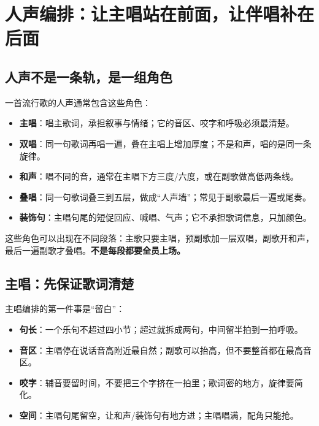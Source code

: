 \chapter{人声编排：让主唱站在前面，让伴唱补在后面}
\label{ch:vocals}


\section{人声不是一条轨，是一组角色}
\label{sec:vocal-roles}

一首流行歌的人声通常包含这些角色：

\begin{itemize}
\item \textbf{主唱}：唱主歌词，承担叙事与情绪；它的音区、咬字和呼吸必须最清楚。
\item \textbf{双唱}：同一句歌词再唱一遍，叠在主唱上增加厚度；不是和声，唱的是同一条旋律。
\item \textbf{和声}：唱不同的音，通常在主唱下方三度/六度，或在副歌做高低两条线。
\item \textbf{叠唱}：同一句歌词叠三到五层，做成“人声墙”；常见于副歌最后一遍或尾奏。
\item \textbf{装饰句}：主唱句尾的短促回应、喊唱、气声；它不承担歌词信息，只加颜色。
\end{itemize}

这些角色可以出现在不同段落：主歌只要主唱，预副歌加一层双唱，副歌开和声，最后一遍副歌才叠唱。\textbf{不是每段都要全员上场。}

\section{主唱：先保证歌词清楚}
\label{sec:lead-vocal}

主唱编排的第一件事是“留白”：

\begin{itemize}
\item \textbf{句长}：一个乐句不超过四小节；超过就拆成两句，中间留半拍到一拍呼吸。
\item \textbf{音区}：主唱停在说话音高附近最自然；副歌可以抬高，但不要整首都在最高音区。
\item \textbf{咬字}：辅音要留时间，不要把三个字挤在一拍里；歌词密的地方，旋律要简化。
\item \textbf{空间}：主唱句尾留空，让和声/装饰句有地方进；主唱唱满，配角只能抢。
\end{itemize}


